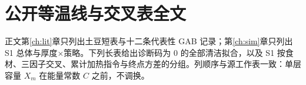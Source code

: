 \chapter{公开等温线与交叉表全文}
\label{app:tables}

正文第\ref{ch:lit}{}章只列出土豆短表与十二条代表性 GAB 记录；第\ref{ch:sim}{}章只列出 S1 总体与厚度\(\times\)策略。下列长表给出诊断码为 \(0\) 的全部清洁拟合，以及 S1 按食材、三因子交叉、累计加热指令与终点方差的分组。列顺序与源工作表一致：单层容量 \(X_m\) 在能量常数 \(C\) 之前，不调换。

\onecolumn




\twocolumn
